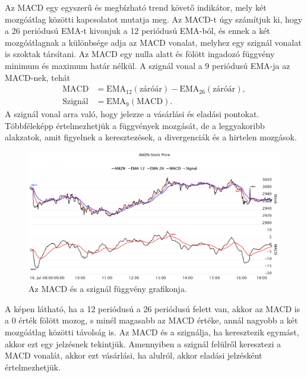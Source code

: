 Az MACD egy egyszerű és megbízható trend követő indikátor, mely két mozgóátlag közötti kapcsolatot mutatja meg. Az MACD-t úgy számítjuk ki, hogy a 26 periódusú EMA-t kivonjuk a 12 periódusú EMA-ból, és ennek a két mozgóátlagnak a különbsége adja az MACD vonalat, melyhez egy szignál vonalat is szoktak társítani. Az MACD egy nulla alatt és fölött ingadozó függvény minimum és maximum határ nélkül. A szignál vonal a 9 periódusú EMA-ja az MACD-nek, tehát
\begin{align*}
\text{MACD} &= \text{EMA}_{12}(\text{záróár}) - \text{EMA}_{26}(\text{záróár}), \\
\text{Szignál} &= \text{EMA}_9(\text{MACD}).
\end{align*}
A szignál vonal arra való, hogy jelezze a vásárlási és eladási pontokat. Többféleképp értelmezhetjük a függvények mozgását, de a leggyakoribb alakzatok, amit figyelnek a keresztezések, a divergenciák és a hirtelen mozgások.
\begin{figure}[ht]
\centering
\includegraphics[width=\textwidth]{images/macd.png}
\caption{Az MACD és a szignál függvény grafikonja.}
\label{fig:macd}
\end{figure}

\noindent A képen látható, ha a 12 periódusú a 26 periódusú felett van, akkor az MACD is a 0 érték fölött mozog, s minél magasabb az MACD értéke, annál nagyobb a két mozgóátlag közötti távolság is. Az MACD és a szignálja, ha keresztezik egymást, akkor ezt egy jelzésnek tekintjük. Amennyiben a szignál felülről keresztezi a MACD vonalát, akkor ezt vásárlási, ha alulról, akkor eladási jelzésként értelmezhetjük.

